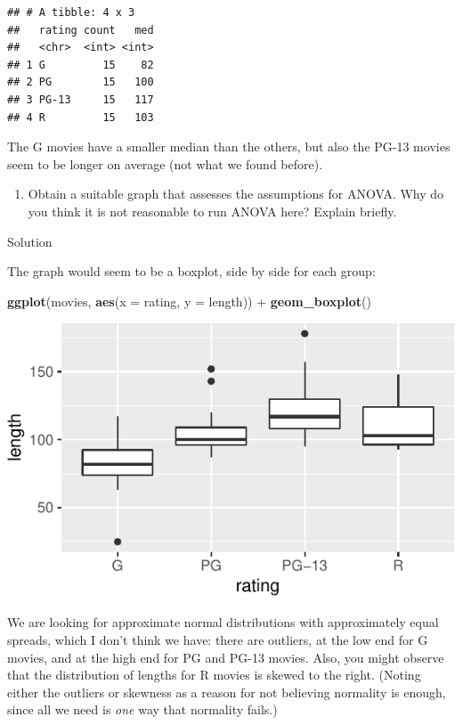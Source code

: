 \documentclass[]{tufte-book}
\newenvironment{Shaded}{}{}
\newcommand{\DataTypeTok}[1]{\textcolor[rgb]{0.56,0.13,0.00}{#1}}
\newcommand{\KeywordTok}[1]{\textcolor[rgb]{0.00,0.44,0.13}{\textbf{#1}}}
\newcommand{\NormalTok}[1]{#1}
\newcommand{\OperatorTok}[1]{\textcolor[rgb]{0.40,0.40,0.40}{#1}}
\newcommand{\StringTok}[1]{\textcolor[rgb]{0.25,0.44,0.63}{#1}}
\providecommand{\tightlist}{%
  \setlength{\itemsep}{0pt}\setlength{\parskip}{0pt}}
\theoremstyle{definition}
\theoremstyle{definition}
\theoremstyle{definition}
\theoremstyle{remark}
\begin{document}
\begin{verbatim}
## # A tibble: 4 x 3
##   rating count   med
##   <chr>  <int> <int>
## 1 G         15    82
## 2 PG        15   100
## 3 PG-13     15   117
## 4 R         15   103
\end{verbatim}

The G movies have a smaller median than the others, but also the PG-13
movies seem to be longer on average (not what we found before).

\begin{enumerate}
\def\labelenumi{(\alph{enumi})}
\setcounter{enumi}{1}
\tightlist
\item
  Obtain a suitable graph that assesses the assumptions for ANOVA. Why
  do you think it is not reasonable to run ANOVA here? Explain briefly.
\end{enumerate}

Solution

The graph would seem to be a boxplot, side by side for each group:

\begin{Shaded}
\begin{Highlighting}[]
\KeywordTok{ggplot}\NormalTok{(movies, }\KeywordTok{aes}\NormalTok{(}\DataTypeTok{x =}\NormalTok{ rating, }\DataTypeTok{y =}\NormalTok{ length)) }\OperatorTok{+}\StringTok{ }
\StringTok{    }\KeywordTok{geom_boxplot}\NormalTok{()}
\end{Highlighting}
\end{Shaded}

\includegraphics{10-analysis-of-variance_files/figure-latex/unnamed-chunk-27-1}

We are looking for approximate normal distributions with approximately
equal spreads, which I don't think we have: there are outliers, at the
low end for G movies, and at the high end for PG and PG-13 movies. Also,
you might observe that the distribution of lengths for R movies is
skewed to the right. (Noting either the outliers or skewness as a reason
for not believing normality is enough, since all we need is \emph{one}
way that normality fails.)
\end{document}
